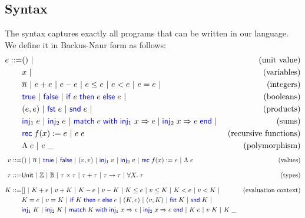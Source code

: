 \documentclass[twoside,11pt,openright]{report}
\theoremstyle{definition}
\newcommand{\BNFdef}{::=}
\newcommand{\ALT}{~|~}
\newcommand{\Keyword}[1]{{\color{blue} \mathsf{#1}}}
\newcommand{\var}{x}
\newcommand{\expr}{e}
\newcommand{\val}{v}
\newcommand{\TT}{()}
\newcommand{\Num}[1]{\overline{#1}}
\newcommand{\True}{\Keyword{true}}
\newcommand{\False}{\Keyword{false}}
\newcommand{\IfCmd}{\Keyword{if}}
\newcommand{\ThenCmd}{\Keyword{then}}
\newcommand{\ElseCmd}{\Keyword{else}}
\def\If#1then#2else#3{\IfCmd{}\;#1\;\ThenCmd{}\;#2\;\ElseCmd{}\;#3}
\newcommand{\Fst}{\Keyword{fst}\;}
\newcommand{\Snd}{\Keyword{snd}\;}
\newcommand{\Inj}[1]{\Keyword{inj}_{#1}\;}
\newcommand{\MatchCmd}{\Keyword{match}}
\newcommand{\WithCmd}{\Keyword{with}}
\newcommand{\EndCmd}{\Keyword{end}}
\def\Match#1with#2=>#3|#4=>#5end{\MatchCmd{}\;#1\;\WithCmd{}\;#2\Rightarrow#3 \;|\;#4\Rightarrow#5\;\EndCmd{}}
\newcommand{\Tvar}{X}
\newcommand{\Tlam}{\Lambda\;}
\newcommand{\Tapp}[1]{#1\;\_}
\newcommand{\empelctx}{[]}
\newcommand{\elctx}{K}
\newcommand{\Tunit}{\mathsf{Unit}}
\newcommand{\Tint}{\mathbb{Z}}
\newcommand{\Tbool}{\mathbb{B}}
\newcommand{\Tprod}[2]{#1 \times #2}
\newcommand{\Tsum}[2]{#1 + #2}
\newcommand{\Tfunc}[2]{#1 \rightarrow #2}
\newcommand{\Tall}[2]{\forall #1.\; #2}
\newcommand{\typ}{\tau}
\begin{document}
\subsection{Syntax}
The syntax captures exactly all programs that can be written in our language. We define it in Backus-Naur form as follows:
\begin{align*}
  \expr \BNFdef & \TT \ALT & \text{(unit value)}\\
                & \var \ALT & \text{(variables)}\\
                & \Num{n} \ALT \expr + \expr \ALT \expr - \expr \ALT
                  \expr \le \expr \ALT \expr < \expr \ALT 
                  \expr = \expr \ALT & \text{(integers)}\\
                & \True \ALT \False \ALT {\If \expr then \expr else \expr} \ALT
                  & \text{(booleans)}\\
                & (\expr, \expr) \ALT \Fst \expr \ALT \Snd \expr \ALT
                  & \text{(products)}\\
                & \Inj{1} \expr \ALT \Inj{2} \expr \ALT 
                  \Match \expr with \Inj{1} \var => \expr | \Inj{2} \var => \expr end \ALT
                  & \text{(sums)}\\
                & \Rec f \var := \expr \ALT \expr \; \expr
                  & \text{(recursive functions)}\\
                & \Tlam \expr \ALT \Tapp{\expr} & \text{(polymorphism)}
\end{align*}
\begin{align*}
  \val \BNFdef  & \TT \ALT \Num{n} \ALT \True \ALT \False \ALT
                  (\val, \val) \ALT \Inj{1} \val \ALT \Inj{2} \val \ALT
                  \Rec f \var := \expr \ALT \Tlam \expr
                  & \text{(values)}\\[8pt]
  \typ \BNFdef  & \Tunit \ALT \Tint \ALT \Tbool \ALT {\Tprod \typ \typ} \ALT
                  {\Tsum \typ \typ} \ALT {\Tfunc \typ \typ} \ALT 
                  {\Tall \Tvar \typ} & \text{(types)}\\[8pt]
  \elctx \BNFdef& \empelctx \ALT 
                  \elctx + \expr \ALT \val + \elctx \ALT
                  \elctx - \expr \ALT \val - \elctx \ALT
                  \elctx \le \expr \ALT \val \le \elctx \ALT
                  \elctx < \expr \ALT \val < \elctx \ALT 
                  & \text{(evaluation context)}\\
                & \elctx = \expr \ALT \val = \elctx \ALT
                  {\If \elctx then \expr else \expr} \ALT
                  (\elctx, \expr) \ALT (\val, \elctx) \ALT
                  \Fst \elctx \ALT \Snd \elctx \ALT\\
                & \Inj{1} \elctx \ALT \Inj{2} \elctx \ALT
                  \Match \elctx with \Inj{1} \var => \expr | \Inj{2} \var => \expr end \ALT
                  \elctx \; \expr \ALT \val \; \elctx \ALT \Tapp{\elctx}
\end{align*}
\end{document}
